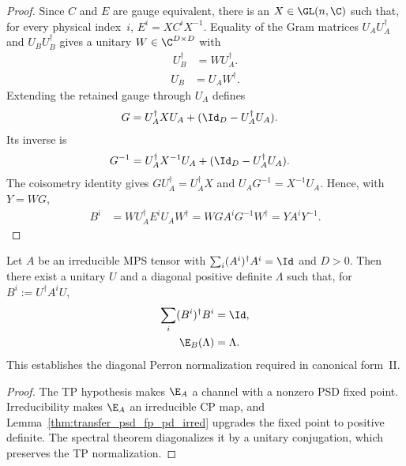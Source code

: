 \begin{proof}
    \leanok
    Since $C$ and $E$ are gauge equivalent, there is an $X\in\GL(n,\C)$ such
    that, for every physical index~$i$,
    $E^i=XC^iX^{-1}$. Equality of the
    Gram matrices $U_AU_A^\dagger$ and $U_BU_B^\dagger$ gives a unitary
    $W\in\C^{D\times D}$ with
    \begin{align}
        U_B^\dagger
         & =WU_A^\dagger.
    \end{align}
    \begin{align}
        U_B
         & =U_AW^\dagger.
    \end{align}
    Extending the retained gauge through $U_A$ defines
    \begin{align}
        G
         & =U_A^\dagger XU_A+(\Id_D-U_A^\dagger U_A).
    \end{align}
    Its inverse is
    \begin{align}
        G^{-1}
         & =U_A^\dagger X^{-1}U_A+(\Id_D-U_A^\dagger U_A).
    \end{align}
    The coisometry identity gives
    $GU_A^\dagger=U_A^\dagger X$ and
    $U_AG^{-1}=X^{-1}U_A$. Hence, with $Y=WG$,
    \begin{align}
        B^i
         & =WU_A^\dagger E^iU_AW^\dagger
        =WG A^iG^{-1}W^\dagger
        =Y A^iY^{-1}.
    \end{align}
\end{proof}

\begin{lemma}
    \label{thm:form_II}
    \leanok
    Let $A$ be an irreducible MPS tensor with
    $\sum_i(A^i)^\dagger A^i=\Id$ and $D>0$. Then there exist a unitary $U$
    and a diagonal positive definite $\Lambda$ such that, for
    $B^i:=U^\dagger A^iU$,
    \begin{align}
        \sum_i(B^i)^\dagger B^i
         & =\Id,
        \notag       \\
        \E_B(\Lambda)
         & =\Lambda.
        \notag
    \end{align}
    This establishes the diagonal Perron normalization required in canonical
    form~II.
\end{lemma}

\begin{proof}
    \leanok
    The TP hypothesis makes $\E_A$ a channel with a nonzero PSD fixed point.
    Irreducibility makes $\E_A$ an irreducible CP map, and
    Lemma~\ref{thm:transfer_psd_fp_pd_irred} upgrades the fixed point to positive
    definite. The spectral theorem diagonalizes it by a unitary conjugation,
    which preserves the TP normalization.
\end{proof}


